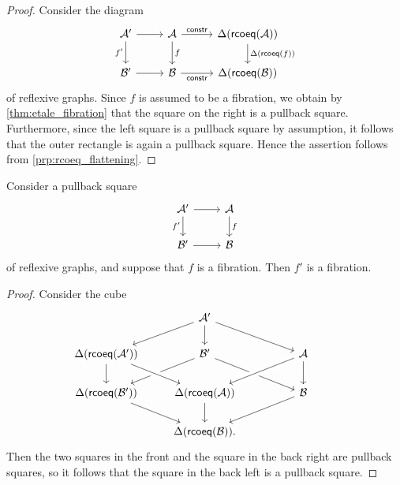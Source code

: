 \begin{proof}
Consider the diagram
\begin{equation*}
\begin{tikzcd}
\mathcal{A}' \arrow[r] \arrow[d,swap,"{f'}"] & \mathcal{A} \arrow[d,"f"] \arrow[r,"\mathsf{constr}"] &[1ex] \Delta(\rcoeq(\mathcal{A})) \arrow[d,"\Delta(\rcoeq(f))"] \\
\mathcal{B}' \arrow[r] & \mathcal{B} \arrow[r,"\mathsf{constr}"'] & \Delta(\rcoeq(\mathcal{B}))
\end{tikzcd}
\end{equation*}
of reflexive graphs. Since $f$ is assumed to be a fibration, we obtain by \cref{thm:etale_fibration} that the square on the right is a pullback square. Furthermore, since the left square is a pullback square by assumption, it follows that the outer rectangle is again a pullback square. Hence the assertion follows from \cref{prp:rcoeq_flattening}.
\end{proof}

\begin{prp}
Consider a pullback square
\begin{equation*}
\begin{tikzcd}
\mathcal{A}' \arrow[r] \arrow[d,swap,"{f'}"] & \mathcal{A} \arrow[d,"f"] \\
\mathcal{B}' \arrow[r] & \mathcal{B}
\end{tikzcd}
\end{equation*}
of reflexive graphs, and suppose that $f$ is a fibration. Then $f'$ is a fibration.
\end{prp}

\begin{proof}
Consider the cube
\begin{equation*}
\begin{tikzcd}
& \mathcal{A}' \arrow[dr] \arrow[d] \arrow[dl] \\
\Delta(\rcoeq(\mathcal{A}')) \arrow[d] & \mathcal{B}' \arrow[dl] \arrow[dr] & \mathcal{A} \arrow[dl,crossing over] \arrow[d] \\
\Delta(\rcoeq(\mathcal{B}')) \arrow[dr] & \Delta(\rcoeq(\mathcal{A})) \arrow[d] \arrow[from=ul,crossing over] & \mathcal{B} \arrow[dl] \\
& \Delta(\rcoeq(\mathcal{B})). & \phantom{\Delta(\rcoeq(\mathcal{A}'))}
\end{tikzcd}
\end{equation*}
Then the two squares in the front and the square in the back right are pullback squares, so it follows that the square in the back left is a pullback square.
\end{proof}

